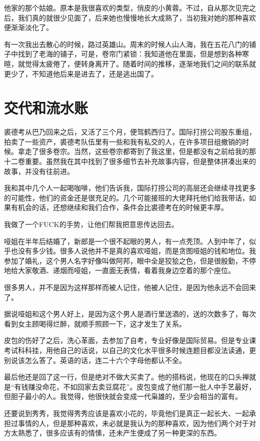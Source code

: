 他家的那个姑娘。原本是我很喜欢的类型，俏皮的小黄蓉。不过，自从那次见完之后，我们真的就很少见面了，后来她也慢慢地长大成熟了，当初我对她的那种喜欢便渐渐淡化了。

有一次我出去散心的时候，路过英雄山。周末的时候人山人海，我在五花八门的铺子中找到了老海的铺子，可是，卷帘门紧锁：我知道他在里面，但是想到各种寒暄，就觉得太疲倦了，便转身离开了。随着时间的推移，逐渐地我们之间的联系就更少了，不知道他后来是进去了，还是逃出国了。

\chapter{交代和流水账}

裘德考从巴乃回来之后，又活了三个月，便驾鹤西归了。国际打捞公司股东重组，拍卖了一些资产，裘德考队伍里有一些和我有私交的人，在许多项目组撤销的时候。拿走了很多卷宗。当然，这些卷宗都寄到了我这里，但是都没有之前给我的那十二卷重要。虽然我在其中找到了很多细节去补充故事内容，但是整体拼凑出来的故事，并没有往前进。

我和其中几个人一起喝咖啡，他们告诉我，国际打捞公司的高层还会继续寻找更多的可能性，他们的资金还是很充足的。几个可能接班的大佬拜托他们给我带话，如果有机会的话，还想继续和我们合作，条件会比裘德考在的时候更丰厚。

我做了一个FUCK的手势，让他们帮我把意思传达回去。

哑姐在半年后结婚了，新郎是一个很不起眼的男人，有一点秃顶。人到中年了，似乎也没有多少钱。很多人说他并不是真的喜欢哑姐，而是贪图哑姐的钱和地位。我参加了婚礼，这个男人名字好像叫做阿邦，眼中全是狡狯之色，但是很殷勤，不停地给大家敬酒、递烟而哑姐，一直面无表情，看着我身边空着的那个座位。

很多男人，并不是因为这样那样而被人记住，他被人记住，是因为他永远不会回来了。

据说哑姐和这个男人好上，是因为这个男人是酒行里送酒的，送的次数多了，每次看到女主顾喝得烂醉，就顺手照顾一下，这才发生了关系。

皮包的伤好了之后，洗心革面，去参加了自考，专业好像是国际贸易。但是专业课考试科科挂，用他自己的话说，以自己的文化水平很多时候连题目都没法读通，更别说该怎么答了。英语的话，连二十六个字母他都认不全。

最后他还是回了这一行，但是绝对不做大买卖了。他的搭档说，他现在的口头禅就是“有钱赚没命花，不如回家去卖豆腐花”。皮包变成了他们那一批人中手艺最好，但胆子最小的人。我觉得，他很快就会变成一代枭雄的，至少会相当的富有。

还要说到秀秀，我觉得秀秀应该是喜欢小花的，毕竟他们是真正一起长大、一起承担过事情的人，但是那种喜欢，未必就是我认为的那种喜欢，因为他们两个对于对方太熟悉了，很多应该有的情愫，还未产生便成了另一种更深的东西。

